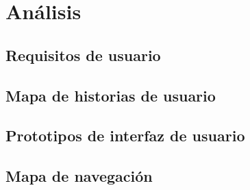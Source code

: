 \section{Análisis} \label{sec:7_analisis}

\subsection{Requisitos de usuario} \label{subsec:7_1_requisitos_usuario}

\subsection{Mapa de historias de usuario} \label{subsec:7_2_mapa_historias_usuario}

\subsection{Prototipos de interfaz de usuario} \label{subsec:7_3_prototipos_interfaz_usuario}

\subsection{Mapa de navegación} \label{subsec:7_4_mapa_navegacion}
